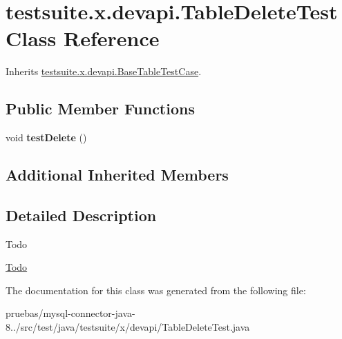 \hypertarget{classtestsuite_1_1x_1_1devapi_1_1_table_delete_test}{}\section{testsuite.\+x.\+devapi.\+Table\+Delete\+Test Class Reference}
\label{classtestsuite_1_1x_1_1devapi_1_1_table_delete_test}


Inherits \mbox{\hyperlink{classtestsuite_1_1x_1_1devapi_1_1_base_table_test_case}{testsuite.\+x.\+devapi.\+Base\+Table\+Test\+Case}}.

\subsection*{Public Member Functions}
\begin{DoxyCompactItemize}
\item 
\mbox{\label{classtestsuite_1_1x_1_1devapi_1_1_table_delete_test_a04e57892fb3ea103eb701ea946eb5a14}} 
void {\bfseries test\+Delete} ()
\end{DoxyCompactItemize}
\subsection*{Additional Inherited Members}


\subsection{Detailed Description}
\begin{DoxyRefDesc}{Todo}
\item[\mbox{\hyperlink{todo__todo000008}{Todo}}]\end{DoxyRefDesc}


The documentation for this class was generated from the following file\+:\begin{DoxyCompactItemize}
\item 
pruebas/mysql-\/connector-\/java-\/8../src/test/java/testsuite/x/devapi/Table\+Delete\+Test.\+java\end{DoxyCompactItemize}
